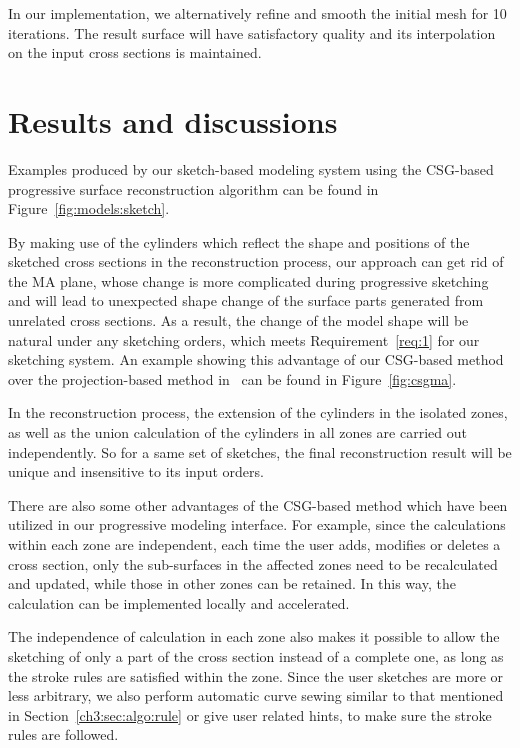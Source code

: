 In our implementation, we alternatively refine and smooth the initial mesh for 10 iterations. The result surface will have satisfactory quality and its interpolation on the input cross sections is maintained.


\section{Results and discussions}
\label{ch4:sec:disc}

Examples produced by our sketch-based modeling  system using the
CSG-based progressive surface reconstruction algorithm can be found
in Figure~\ref{fig:models:sketch}.

By making use of the cylinders which reflect the shape and
positions of the sketched cross sections in the reconstruction
process, our approach can get rid of the MA plane, whose change is
more complicated during progressive sketching and will lead to
unexpected shape change of the surface parts generated from
unrelated cross sections. As a result, the change of the model shape
will be natural under any sketching orders, which meets
Requirement~\ref{req:1} for our sketching system. An example showing
this advantage of our CSG-based method over the projection-based
method in~\cite{LBDLJ08} can be found in Figure~\ref{fig:csgma}.

In the reconstruction process, the extension of the cylinders in
the isolated zones, as well as the union calculation of the
cylinders in all zones are carried out independently. So for a same
set of sketches, the final reconstruction result will be unique and
insensitive to its input orders.

There are also some other advantages of the  CSG-based method which
have been utilized in our progressive modeling interface. For
example, since the calculations within each zone are independent,
each time the user adds, modifies or deletes a cross section, only
the sub-surfaces in the affected zones need to be recalculated and
updated, while those in other zones can be retained. In this way,
the calculation can be implemented locally and accelerated.

The independence of calculation in each zone also makes it possible
to allow the sketching of only a part of the cross section instead
of a complete one, as long as the stroke rules are satisfied within
the zone. Since the user sketches are more or less arbitrary, we
also perform automatic curve sewing similar to that mentioned in
Section~\ref{ch3:sec:algo:rule} or give user related hints, to make
sure the stroke rules are followed.

